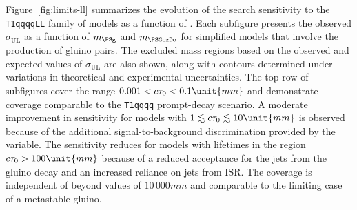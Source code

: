 Figure~\ref{fig:limits-ll} summarizes the evolution of the search
sensitivity to the \texttt{T1qqqqLL} family of models as a function of
\ctau. Each subfigure presents the observed $\sigma_\text{UL}$ as a
function of $m_{\PSg}$ and $m_{\PSGczDo}$ for simplified models that
involve the production of gluino pairs. The excluded mass regions
based on the observed and expected values of $\sigma_\text{UL}$ are
also shown, along with contours determined under variations in
theoretical and experimental uncertainties. The top row of subfigures
cover the range $0.001 < \ctau < 0.1\unit{mm}$ and demonstrate
coverage comparable to the \texttt{T1qqqq} prompt-decay scenario. A
moderate improvement in sensitivity for models with $1 \lesssim \ctau
\lesssim 10\unit{mm}$ is observed because of the additional
signal-to-background discrimination provided by the \nb variable. The
sensitivity reduces for models with lifetimes in the region $\ctau >
100\unit{mm}$ because of a reduced acceptance for the jets from the
gluino decay and an increased reliance on jets from ISR. The coverage
is independent of \ctau beyond values of $10\,000\unit{mm}$ and
comparable to the limiting case of a metastable gluino.

